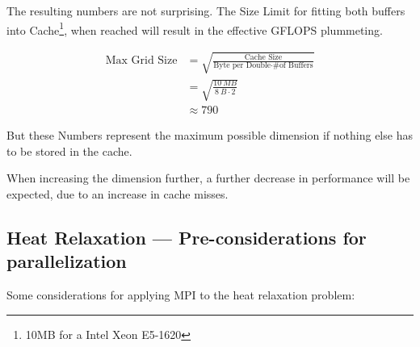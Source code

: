 \documentclass[]{scrartcl}
\begin{document}
The resulting numbers are not surprising.
The Size Limit for fitting both buffers into Cache\footnote{10MB for a Intel Xeon E5-1620}, when reached will result in the effective GFLOPS plummeting.


\begin{align}
    \text{Max Grid Size} &= \sqrt{\frac{\text{Cache Size}}{\text{Byte per Double} \cdot \text{\# of Buffers}}}\\
                                  &= \sqrt{\frac{\SI{10}{MB}}{\SI{8}{B}\cdot 2}}\\
                                  &\approx 790
\end{align}

But these Numbers represent the maximum possible dimension if nothing else has to be stored in the cache.

When increasing the dimension further, a further decrease in performance will be expected, due to an increase in cache misses.

\subsection{Heat Relaxation --- Pre-considerations for parallelization}
Some considerations for applying MPI to the heat relaxation problem:
\end{document}
